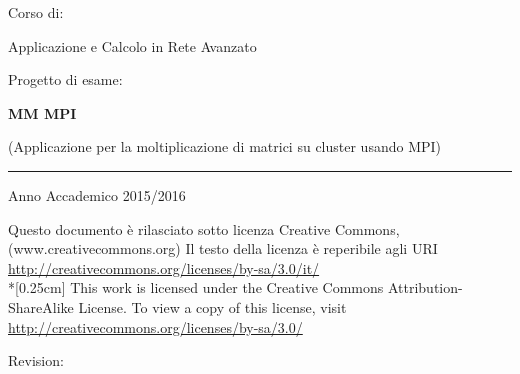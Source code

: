 \begin{titlepage}
\begin{center}
        \small{Corso di:}

        {\Large Applicazione e Calcolo in Rete Avanzato}

        \vspace{0.4cm}

        \small{Progetto di esame:}

        \textbf{\Large MM MPI}

        \scriptsize{(Applicazione per la moltiplicazione di matrici su cluster usando MPI)}

        \vspace{1cm}

        \hfil{
        }\hfil

        \rule[1mm]{\textwidth}{0.2mm}
        Anno Accademico 2015/2016

        \vspace{0.4cm}

            \scriptsize{
                Questo documento è rilasciato sotto licenza Creative Commons, (www.creativecommons.org)
                Il testo della licenza è reperibile agli URI \url{http://creativecommons.org/licenses/by-sa/3.0/it/}
                \\*[0.25cm]
                This work is licensed under the Creative Commons Attribution-ShareAlike License.
                To view a copy of this license, visit \url{http://creativecommons.org/licenses/by-sa/3.0/}
            }
        \vspace{0.4cm}

        
        Revision: \Revision

    \end{center}
\end{titlepage}
